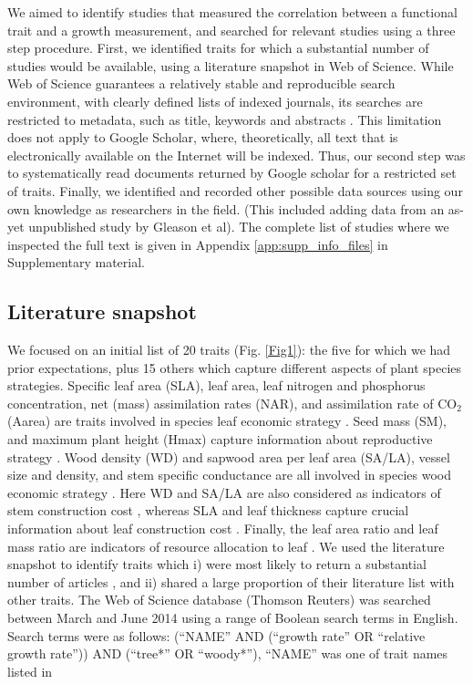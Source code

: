\documentclass[a4paper]{article}\usepackage[]{graphicx}\usepackage[]{color}
\begin{document}
We aimed to identify studies that measured the correlation between a functional trait and a growth measurement, and searched for relevant studies using a three step procedure. First, we identified traits for which a substantial number of studies would be available, using a literature snapshot in Web of Science. While Web of Science guarantees a relatively stable and reproducible search environment, with clearly defined lists of indexed journals, its searches are restricted to metadata, such as title, keywords and abstracts \citep{Beckmann:2012hn}. This limitation does not apply to Google Scholar, where, theoretically, all text that is electronically available on the Internet will be indexed. Thus, our second step was to systematically read documents returned by Google scholar for a restricted set of traits. Finally, we identified and recorded other possible data sources using our own knowledge as researchers in the field. (This included adding data from an as-yet unpublished study by Gleason et al). The complete list of studies where we inspected the full text is given in Appendix \ref{app:supp_info_files} in Supplementary material.

\subsection*{Literature snapshot}\label{literature-snapshot}

We focused on an initial list of 20 traits (Fig. \ref{Fig1}): the five for which we had prior expectations, plus 15 others which capture different aspects of plant species strategies. Specific leaf area (SLA), leaf area, leaf nitrogen and phosphorus concentration, net (mass) assimilation rates (NAR), and assimilation rate of CO$_2$ (Aarea) are traits involved in species leaf economic strategy \citep{Wright:2004jb,Wright:2010tp}. Seed mass (SM), and maximum plant height (Hmax) capture information about reproductive strategy \citep{Falster:2005bw,Moles:2006ft}. Wood density (WD) and sapwood area per leaf area (SA/LA), vessel size and density, and stem specific conductance are all involved in species wood economic strategy \citep{Chave:2009iy}. Here WD and SA/LA are also considered as indicators of stem construction cost \citep{Falster:2011ii}, whereas SLA and leaf thickness capture crucial information about leaf construction cost \citep{Wright:2004jb}. Finally, the leaf area ratio and leaf mass ratio are indicators of resource allocation to leaf \citep{Lambers:1992bj}. We used the literature snapshot to identify traits which i) were most likely to return a substantial number of articles , and ii) shared a large proportion of their literature list with other traits. The Web of Science database (Thomson Reuters) was searched between March and June 2014 using a range of Boolean search terms in English. Search terms were as follows: (``NAME'' AND (``growth rate'' OR ``relative growth rate'')) AND (``tree*'' OR ``woody*''), ``NAME'' was one of trait names listed in 
\end{document}
